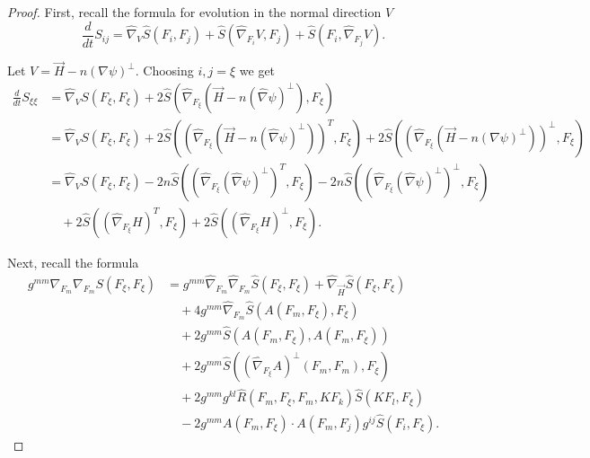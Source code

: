 \documentclass[12pt,letterpaper]{amsart}%
\numberwithin{mycounter}{section}
\theoremstyle{plain}
\numberwithin{equation}{section}
\theoremstyle{definition}
\newcommand{\maxidx}{\mathord{\xi}} %
\begin{document}
\begin{proof}
First, recall the formula for evolution in the normal direction $V$ 
\begin{equation*}
\frac{d}{dt}S_{ij}
  =\hat{\nabla}_{V}\hat{S}\left( F_{i},F_{j}\right)
  +\hat{S}\left( \hat{\nabla}_{F_{i}}V,F_{j}\right)
  +\hat{S}\left( F_{i},\hat{\nabla}_{F_{j}}V\right).
\end{equation*}

Let $V=\vec{H}-n\left( \nabla \psi \right) ^{\perp }.$ 
Choosing $i,j=\maxidx$ we get 
\begin{align*}
\frac{d}{dt}S_{\maxidx\maxidx}
& =\hat{\nabla}_{V}S(F_{\maxidx},F_{\maxidx})
   +2\hat{S}\left( \hat{\nabla}_{F_{\maxidx}}\left( \vec{H}
   -n\left( \hat{\nabla}\psi \right) ^{\perp }\right),F_{\maxidx}\right) \\[6pt]
&=\hat{\nabla}_{V}S(F_{\maxidx},F_{\maxidx})
  +2\hat{S}\left( (\hat{\nabla}_{F_{\maxidx}}(\vec{H}
  -n(\hat{\nabla}\psi)^{\perp}))^T,F_{\maxidx}\right)
  +2\hat{S}((\hat{\nabla}_{F_{\maxidx}}(\vec{H}
  -n(\nabla\psi)^{\perp}))^\perp ,F_{\maxidx}) \\[6pt]
&=\hat{\nabla}_{V}S(F_{\maxidx},F_{\maxidx})
  -2n\hat{S}((\hat{\nabla}_{F_{\maxidx}}(\hat{\nabla}\psi )^{\perp})^T,F_{\maxidx})
  -2n\hat{S}((\hat{\nabla}_{F_{\maxidx}}(\hat{\nabla}\psi)^{\perp})^\perp,F_{\maxidx}) \\
&\quad +2\hat{S}((\hat{\nabla}_{F_{\maxidx}}H)^T,F_{\maxidx})
      +2\hat{S}((\hat{\nabla}_{F_{\maxidx}}H)^\perp,F_{\maxidx}).
\end{align*}

Next, recall the formula
\begin{align*}
g^{mm}\nabla _{F_{m}}\nabla _{F_{m}}S(F_{\maxidx},F_{\maxidx})
& =g^{mm}\hat{\nabla}_{F_{m}}\hat{\nabla}_{F_{m}}\hat{S}(F_{\maxidx},F_{\maxidx})
  +\hat{\nabla}_{\vec{H}}\hat{S}(F_{\maxidx},F_{\maxidx}) \\
& \quad +4g^{mm}\hat{\nabla}_{F_{m}}\hat{S}(A(F_{m},F_{\maxidx}),F_{\maxidx}) \\
& \quad +2g^{mm}\hat{S}(A(F_{m},F_{\maxidx}),A(F_{m},F_{\maxidx})) \\
& \quad +2g^{mm}\hat{S}\!\left( (\hat{\nabla}_{F_{\maxidx}}A)^{\perp}
        (F_{m},F_{m}),F_{\maxidx}\right)  \\
& \quad +2g^{mm} g^{kl} \hat{R}(F_{m},F_{\maxidx},F_{m},KF_{k})\hat{S}\left(
        KF_{l},F_{\maxidx}\right)  \\
& \quad -2g^{mm}A(F_{m},F_{\maxidx})\cdot A(F_{m},F_{j})g^{ij}
            \hat{S}\left(F_{i},F_{\maxidx}\right).
\end{align*}


\end{proof}
\end{document}
